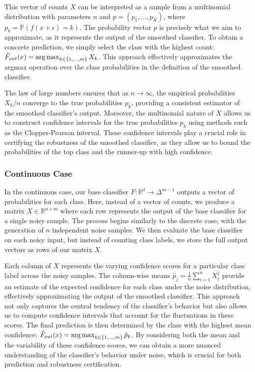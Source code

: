 This vector of counts $X$ can be interpreted as a sample from a multinomial distribution with parameters $n$ and $p = (p_1, \ldots, p_K)$, where $p_k = \mathbb{P}(f(x + \epsilon) = k)$.
The probability vector $p$ is precisely what we aim to approximate, as it represents the output of the smoothed classifier.
To obtain a concrete prediction, we simply select the class with the highest count: $\hat{F}_{out}(x) = \operatorname*{arg\,max}_{k \in \{1, \ldots, m\}} X_k$.
This approach effectively approximates the argmax operation over the class probabilities in the definition of the smoothed classifier.

The law of large numbers ensures that as $n \rightarrow \infty$, the empirical probabilities $X_k / n$ converge to the true probabilities $p_k$, providing a consistent estimator of the smoothed classifier's output.
Moreover, the multinomial nature of $X$ allows us to construct confidence intervals for the true probabilities $p_k$ using methods such as the Clopper-Pearson interval.
These confidence intervals play a crucial role in certifying the robustness of the smoothed classifier, as they allow us to bound the probabilities of the top class and the runner-up with high confidence.

\subsubsection{Continuous Case}\label{subsubsec:continuous-case-monte-carlo-simulation}
In the continuous case, our base classifier $F: \mathbb{R}^d \rightarrow \Delta^{m-1}$ outputs a vector of probabilities for each class.
Here, instead of a vector of counts, we produce a matrix $X \in \mathbb{R}^{n \times m}$ where each row represents the output of the base classifier for a single noisy sample.
The process begins similarly to the discrete case, with the generation of $n$ independent noise samples.
We then evaluate the base classifier on each noisy input, but instead of counting class labels, we store the full output vectors as rows of our matrix $X$.

Each column of $X$ represents the varying confidence scores for a particular class label across the noisy samples.
The column-wise means $\hat{p}_j = \frac{1}{n} \sum_{i=1}^n X_i^j$ provide an estimate of the expected confidence for each class under the noise distribution, effectively approximating the output of the smoothed classifier.
This approach not only captures the central tendency of the classifier's behavior but also allows us to compute confidence intervals that account for the fluctuations in these scores.
The final prediction is then determined by the class with the highest mean confidence: $\hat{F}_{out}(x) = \operatorname*{arg\,max}_{k \in \{1, \ldots, m\}} \hat{p}_k$.
By considering both the mean and the variability of these confidence scores, we can obtain a more nuanced understanding of the classifier's behavior under noise, which is crucial for both prediction and robustness certification.

